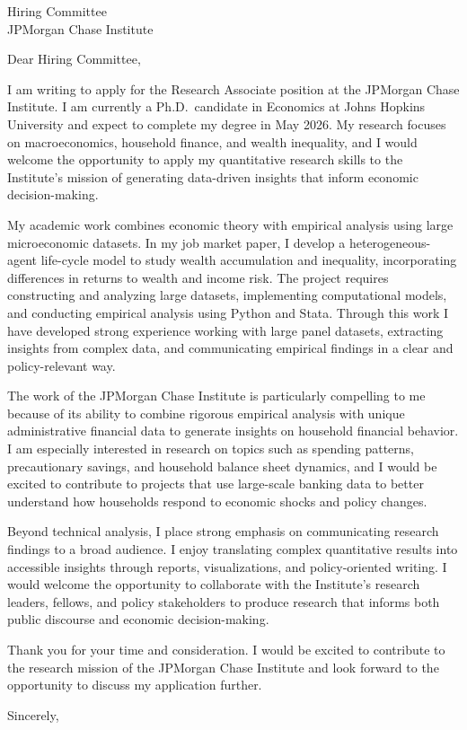 \documentclass[11pt]{letter}
\begin{document}
\begin{letter}{Hiring Committee \\
JPMorgan Chase Institute}

\opening{Dear Hiring Committee,}

I am writing to apply for the Research Associate position at the JPMorgan Chase Institute. I am currently a Ph.D.\ candidate in Economics at Johns Hopkins University and expect to complete my degree in May 2026. My research focuses on macroeconomics, household finance, and wealth inequality, and I would welcome the opportunity to apply my quantitative research skills to the Institute’s mission of generating data-driven insights that inform economic decision-making.

My academic work combines economic theory with empirical analysis using large microeconomic datasets. In my job market paper, I develop a heterogeneous-agent life-cycle model to study wealth accumulation and inequality, incorporating differences in returns to wealth and income risk. The project requires constructing and analyzing large datasets, implementing computational models, and conducting empirical analysis using Python and Stata. Through this work I have developed strong experience working with large panel datasets, extracting insights from complex data, and communicating empirical findings in a clear and policy-relevant way.

The work of the JPMorgan Chase Institute is particularly compelling to me because of its ability to combine rigorous empirical analysis with unique administrative financial data to generate insights on household financial behavior. I am especially interested in research on topics such as spending patterns, precautionary savings, and household balance sheet dynamics, and I would be excited to contribute to projects that use large-scale banking data to better understand how households respond to economic shocks and policy changes.

Beyond technical analysis, I place strong emphasis on communicating research findings to a broad audience. I enjoy translating complex quantitative results into accessible insights through reports, visualizations, and policy-oriented writing. I would welcome the opportunity to collaborate with the Institute’s research leaders, fellows, and policy stakeholders to produce research that informs both public discourse and economic decision-making.

Thank you for your time and consideration. I would be excited to contribute to the research mission of the JPMorgan Chase Institute and look forward to the opportunity to discuss my application further.

\closing{Sincerely,}

\end{letter}
\end{document}
